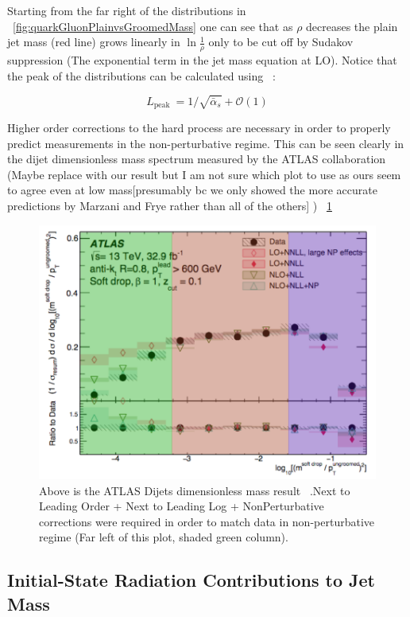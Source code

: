  Starting from the far right of the distributions in ~\ref{fig:quarkGluonPlainvsGroomedMass} one can see that as $\rho$ decreases the plain jet mass (red line) grows linearly in $\ln \frac{1}{\rho}$ only to be cut off by Sudakov suppression (The exponential term in the jet mass equation at LO). Notice that the peak of the distributions can be calculated using ~\cite{mmdt}:\newline

\begin{equation}
L_{\text {peak }}=1 / \sqrt{\bar{\alpha}_{s}}+\mathcal{O}(1)
\end{equation}
 




Higher order corrections to the hard process are necessary in order to properly predict measurements in the non-perturbative regime. This can be seen clearly in the dijet dimensionless mass spectrum measured by the ATLAS collaboration (Maybe replace with our result but I am not sure which plot to use as ours seem to agree even at low mass[presumably bc we only showed the more accurate predictions by Marzani and Frye rather than all of the others] ) ~\ref{fig:atlasDijet}


\begin{figure}[htb]
\centering
\includegraphics[width=.60\textwidth]{visuals/ATLAS-rho-highorder.png}
\caption{Above is the ATLAS Dijets dimensionless mass result ~\cite{Dreyer:2018nbf}.Next to Leading Order + Next to Leading Log + NonPerturbative corrections were required in order to match data in non-perturbative regime (Far left of this plot, shaded green column).}
\label{fig:atlasDijet}
\end{figure}






\subsection{Initial-State Radiation Contributions to Jet Mass }\label{sec:jetmassISR}


